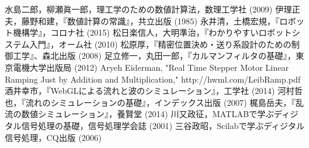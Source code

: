 \documentclass[twocolumn,oneside,a4paper]{article}
\begin{document}



\begin{thebibliography}{99}
    水島二郎，柳瀬眞一郎，理工学のための数値計算法，数理工学社 (2009)
   伊理正夫，藤野和建，『数値計算の常識』，共立出版 (1985)
    永井清，土橋宏規，『ロボット機構学』，コロナ社 (2015)
     松日楽信人，大明準治，『わかりやすいロボットシステム入門』，オーム社 (2010)
     松原厚，『精密位置決め・送り系設計のための制御工学』、森北出版 (2008)
   足立修一，丸田一郎，『カルマンフィルタの基礎』，東京電機大学出版局 (2012)
   Aryeh Eiderman, "Real Time Stepper Motor Linear Ramping Just by Addition and Multiplication," http://hwml.com/LeibRamp.pdf
   酒井幸市，『WebGLによる流れと波のシミュレーション』，工学社 (2014)
   河村哲也，『流れのシミュレーションの基礎』，インデックス出版 (2007)
    梶島岳夫，『乱流の数値シミュレーション』，養賢堂 (2014)
    川又政征，MATLABで学ぶディジタル信号処理の基礎，信号処理学会誌 (2001)
    三谷政昭，Scilabで学ぶディジタル信号処理，CQ出版 (2006)
\end{thebibliography}
\end{document}
